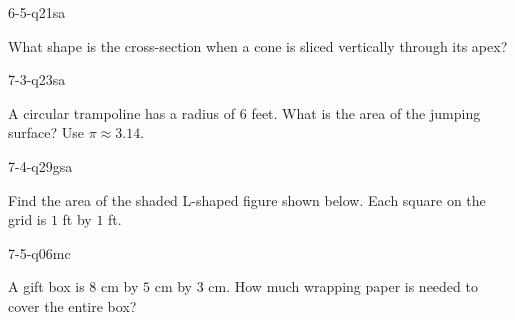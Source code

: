 \begin{practiceQuestion}{6-5-q21}{sa}
\begin{questionText}
What shape is the cross-section when a cone is sliced vertically through its apex?
\end{questionText}
\end{practiceQuestion}

\begin{practiceQuestion}{7-3-q23}{sa}
\begin{questionText}
A circular trampoline has a radius of $6$ feet. What is the area of the jumping surface? Use $\pi \approx 3.14$.
\end{questionText}
\end{practiceQuestion}

\begin{practiceQuestion}{7-4-q29}{gsa}
\begin{questionText}
Find the area of the shaded L-shaped figure shown below. Each square on the grid is $1$ ft by $1$ ft.

\begin{center}
\end{center}
\end{questionText}
\end{practiceQuestion}

\begin{practiceQuestion}{7-5-q06}{mc}
\begin{questionText}
A gift box is $8$ cm by $5$ cm by $3$ cm. How much wrapping paper is needed to cover the entire box?
\end{questionText}
\end{practiceQuestion}

